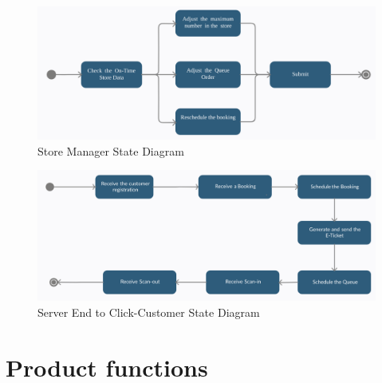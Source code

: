 \documentclass[a4paper,12pt]{report}
\begin{document}
\begin{figure}[H] 
	\centering
	\includegraphics[scale=0.43]{State_diagram2.png}
	\caption{Store Manager State Diagram}
	\centering
	\label{State Diagram 2}
\end{figure}

\begin{figure}[H] 
	\centering
	\includegraphics[scale=0.38]{State_diagram3.png}
	\caption{Server End to Click-Customer State Diagram}
	\centering
	\label{State Diagram 3}
\end{figure}


\newpage

\section{Product functions}
\end{document}
